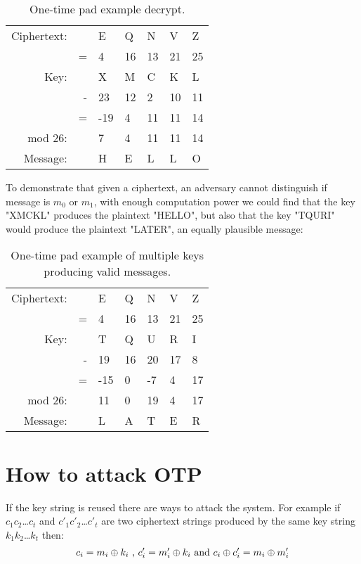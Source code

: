 \documentclass{article}
\newcommand*\xor{\mathbin{\oplus}}
\begin{document}
\begin{table}[!htp]
 \centering
 \label{ex2}
  \begin{tabular}{r r l l l l l}
  \\ \hline
Ciphertext: &&   E &  Q &  N &  V &  Z \\
         & = &   4 & 16 & 13 & 21 & 25 \\ \hline
 Key:    &   &   X &  M &  C &  K &  L \\
         & - &  23 & 12 &  2 & 10 & 11 \\ \hline
         & = & -19 &  4 & 11 & 11 & 14 \\
 mod 26: &   &   7 &  4 & 11 & 11 & 14 \\
Message: &   &   H &  E &  L &  L &  O \\ \hline
   \end{tabular}
 \caption{One-time pad example decrypt.}
\end{table}

To demonstrate that given a ciphertext, an adversary cannot distinguish if message is $m_0$ or $m_1$, with enough computation power we could find that the key "XMCKL" produces the plaintext "HELLO", but also that  the key "TQURI" would produce the plaintext "LATER", an equally plausible message:

\begin{table}[!htp]
 \centering
 \label{ex3}
  \begin{tabular}{r r l l l l l}
  \\ \hline
Ciphertext: &&   E &  Q &  N &  V &  Z \\
         & = &   4 & 16 & 13 & 21 & 25 \\ \hline
 Key:    &   &   T &  Q &  U &  R &  I \\
         & - &  19 & 16 & 20 & 17 &  8 \\ \hline
         & = & -15 &  0 & -7 &  4 & 17 \\
 mod 26: &   &  11 &  0 & 19 &  4 & 17 \\
Message: &   &   L &  A &  T &  E &  R \\ \hline
   \end{tabular}
 \caption{One-time pad example of multiple keys producing valid messages.}
\end{table}

\section{How to attack OTP}

If the key string is reused there are ways to attack the system. For example if $c_1c_2$\dots$c_t$ and $c'_1c'_2$\dots$c'_t$ are two ciphertext strings produced by the same key string $k_1k_2$\dots$k_t$ then:
\begin{eqnarray}
\label{eqprop}
c_i = m_i \xor k_i
\textnormal{ , }
c'_i = m'_i \xor k_i
\textnormal{ and }
c_i \xor c'_i = m_i \xor m'_i
\end{eqnarray}
\end{document}
